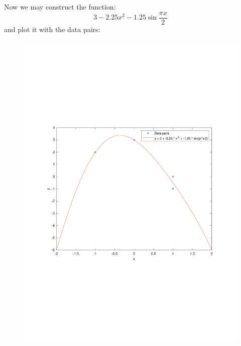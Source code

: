 Now we may construct the function:
\begin{equation*}
  3-2.25x^2-1.25\sin{\frac{\pi{}x}{2}}
\end{equation*}
and plot it with the data pairs:

\begin{figure}[h]
  \centering
  \includegraphics[]{images/Problem_2_a_plot.pdf}
\end{figure}
